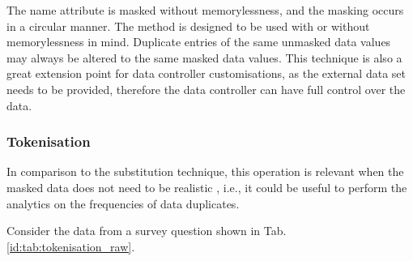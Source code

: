 \documentclass[a4paper,twoside,12pt]{book}
\begin{document}
%
The name attribute is masked without memorylessness, and the masking occurs in a circular manner.
%
The method is designed to be used with or without memorylessness in mind. Duplicate entries of the same unmasked data values may always be altered to the same masked data values. This technique is also a great extension point for data controller customisations, as the external data set needs to be provided, therefore the data controller can have full control over the data.

\subsubsection{Tokenisation}

In comparison to the substitution technique, this operation is relevant when the masked data does not need to be realistic \cite{bib:anonymization_planning}, i.e., it could be useful to perform the analytics on the frequencies of data duplicates.

Consider the data from a survey question shown in Tab. \ref{id:tab:tokenisation_raw}.

\end{document}
